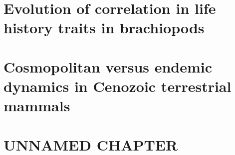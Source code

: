\documentclass[12pt,letterpaper]{article}
\begin{document}
\section{Evolution of correlation in life history traits in brachiopods}

\section{Cosmopolitan versus endemic dynamics in Cenozoic terrestrial mammals}

\section{UNNAMED CHAPTER}



\end{document}
